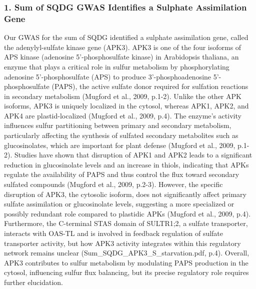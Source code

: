 \documentclass[10pt,letterpaper]{article}
\begin{document}
\subsubsection*{1. Sum of SQDG GWAS Identifies a Sulphate Assimilation Gene}
Our GWAS for the sum of SQDG identified a sulphate assimilation gene, called the adenylyl-sulfate kinase gene (APK3). APK3 is one of the four isoforms of APS kinase (adenosine 5'-phosphosulfate kinase) in Arabidopsis thaliana, an enzyme that plays a critical role in sulfur metabolism by phosphorylating adenosine 5'-phosphosulfate (APS) to produce 3'-phosphoadenosine 5'-phosphosulfate (PAPS), the active sulfate donor required for sulfation reactions in secondary metabolism (Mugford et al., 2009, p.1-2). Unlike the other APK isoforms, APK3 is uniquely localized in the cytosol, whereas APK1, APK2, and APK4 are plastid-localized (Mugford et al., 2009, p.4). The enzyme's activity influences sulfur partitioning between primary and secondary metabolism, particularly affecting the synthesis of sulfated secondary metabolites such as glucosinolates, which are important for plant defense (Mugford et al., 2009, p.1-2). Studies have shown that disruption of APK1 and APK2 leads to a significant reduction in glucosinolate levels and an increase in thiols, indicating that APKs regulate the availability of PAPS and thus control the flux toward secondary sulfated compounds (Mugford et al., 2009, p.2-3). However, the specific disruption of APK3, the cytosolic isoform, does not significantly affect primary sulfate assimilation or glucosinolate levels, suggesting a more specialized or possibly redundant role compared to plastidic APKs (Mugford et al., 2009, p.4). Furthermore, the C-terminal STAS domain of SULTR1;2, a sulfate transporter, interacts with OAS-TL and is involved in feedback regulation of sulfate transporter activity, but how APK3 activity integrates within this regulatory network remains unclear (Sum\_SQDG\_APK3\_S\_starvation.pdf, p.4). Overall, APK3 contributes to sulfur metabolism by modulating PAPS production in the cytosol, influencing sulfur flux balancing, but its precise regulatory role requires further elucidation.


\end{document}

